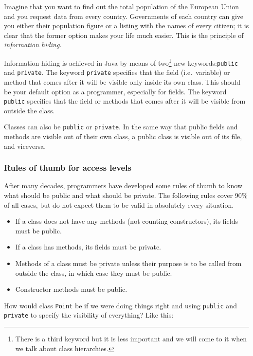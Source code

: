 Imagine that you want to find out the total population of the European
Union and you request data from every country. Governments of each
country can give you either their population figure or a listing with
the names of every citizen; it is clear that the former option makes
your life much easier. This is the principle of \emph{information
  hiding}. 

Information hiding is achieved in Java by means of two\footnote{There
  is a third keyword but it is 
less important and we will come to it when we talk about class
hierarchies.} new keywords:\verb+public+ and \verb+private+. 
The keyword \verb+private+ specifies that the field (i.e.~variable) or
method that comes after it will be visible only inside its own
class. This should be your default option as a programmer, especially
for fields. The keyword \verb+public+ specifies that the field or
methods that comes after it will be visible from outside the class. 

Classes can also be \verb+public+ or \verb+private+. In the same way
that public fields and methods are visible out of their own class, a
public class is visible out of its file, and viceversa. 


\subsubsection*{Rules of thumb for access levels}
\label{sec:rules-thumb-access}

After many decades, programmers have developed some rules of thumb
to know what should be public and what should be private. The
following rules cover 90\% of all cases, but do not expect them to be
valid in absolutely every situation. 

\begin{itemize}
\item If a class does not have any methods (not counting
  constructors), its fields must be public.
\item If a class has methods, its fields must be private.
\item Methods of a class must be private unless their purpose is to be
  called from outside the class, in which case they must be public.
\item Constructor methods must be public. 
\end{itemize}

How would class \verb+Point+ be if we were doing things right and
using \verb+public+ and \verb+private+ to specify the visibility of
everything? Like this: 

